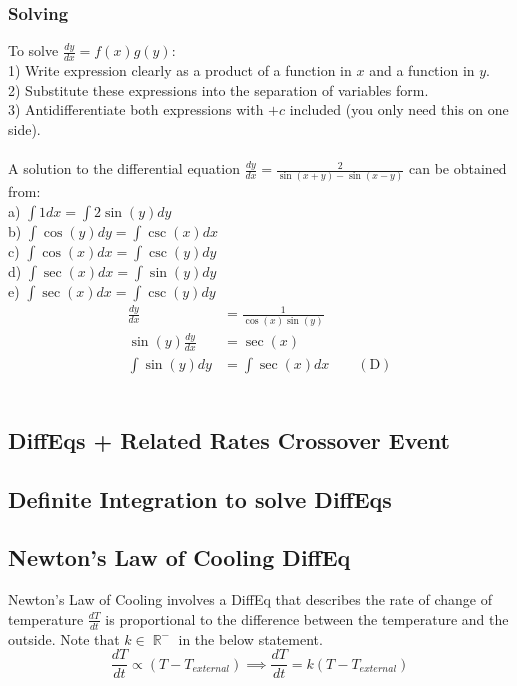 \documentclass[a4paper,twoside]{article}
\DeclareMathOperator\R{\mathbb{R}}
\newenvironment{examquestion}[1]{%
	\mbox{}\\\tcolorbox[beamer,breakable,%
	title=Exam-style Question: #1,standard jigsaw,opacityback=0, colframe=red!75!black]}{\endtcolorbox\mbox{}\\}
\begin{document}
			\subsubsection{Solving}
				To solve $\displaystyle\frac{dy}{dx}=f(x)g(y)$:\\
				1) Write expression clearly as a product of a function in $x$ and a function in $y$.\\
				2) Substitute these expressions into the separation of variables form.\\
				3) Antidifferentiate both expressions with $+c$ included (you only need this on one side).\\
			\begin{examquestion}{2018 Exam 2 Question A9}
				A solution to the differential equation $\displaystyle \frac{dy}{dx}=\frac{2}{\sin(x+y)-\sin(x-y)}$ can be obtained from:\\
				a) $\displaystyle \int1dx=\int2\sin(y)dy$\\
				b) $\displaystyle \int\cos(y)dy=\int\csc(x)dx$\\
				c) $\displaystyle \int\cos(x)dx=\int\csc(y)dy$\\
				d) $\displaystyle \int\sec(x)dx=\int\sin(y)dy$\\
				e) $\displaystyle \int\sec(x)dx=\int\csc(y)dy$\\
				\begin{align*}
					\frac{dy}{dx}&=\frac{1}{\cos(x)\sin(y)} \\
					\sin(y)\frac{dy}{dx}&=\sec(x) \\
					\int\sin(y)dy&=\int\sec(x)dx \qquad \mathrm{(D)}
				\end{align*}
			\end{examquestion} 
		\subsection{DiffEqs + Related Rates Crossover Event}
			
		\subsection{Definite Integration to solve DiffEqs}
		
		\subsection{Newton's Law of Cooling DiffEq} Newton's Law of Cooling involves a DiffEq that describes the rate of change of temperature $\frac{dT}{dt}$ is proportional to the difference between the temperature and the outside. Note that $k\in\R^-$ in the below statement.
		\[
			\frac{dT}{dt}\propto (T-T_{external})\implies\frac{dT}{dt}=k(T-T_{external})
		\]
			
\end{document}
